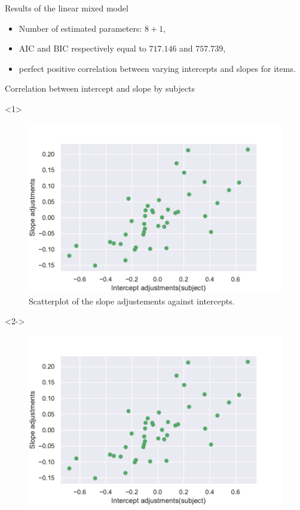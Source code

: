 \documentclass[unknownkeysallowed]{beamer}
\newcommand*{\AIC}{\mathrm{AIC}}
\newcommand*{\BIC}{\mathrm{BIC}}
\begin{document}
\begin{frame}{Results of the linear mixed model}
\begin{itemize}
    \item Number of estimated parameters: $8+1$,
    \item $\AIC$ and $\BIC$ respectively equal to $717.146$ and $757.739$,
    \item perfect positive correlation between varying intercepts and slopes for items.
\end{itemize}
\end{frame}

\begin{frame}{Correlation between intercept and slope by subjects}
\begin{onlyenv}<1>
    \begin{figure}[H]
    \centering
    \includegraphics[scale=.45]{./images/adj_so_inter.pdf}
    \caption{Scatterplot of the slope adjustements against intercepts.}
    \end{figure}
\vspace{-0.3cm}
\end{onlyenv}
\begin{onlyenv}<2->
\begin{figure}[H]
    \centering
    \includegraphics[scale=.45]{./images/adj_so_inter.pdf}

\end{figure}
\end{onlyenv}
\end{frame}
\end{document}
